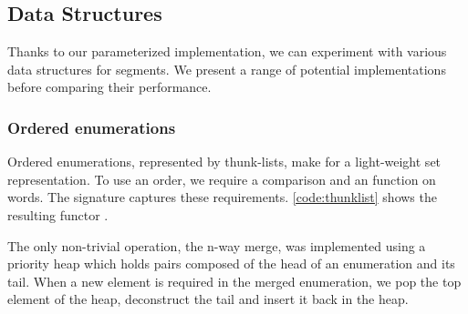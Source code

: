 

\subsection{Data Structures}

Thanks to our parameterized implementation, we can
experiment with various data structures for segments. We present a
range of potential implementations before comparing their performance.

\subsubsection{Ordered enumerations}

Ordered enumerations, represented by thunk-lists, make
for a light-weight set representation.
To use an order, we require a comparison and an
 function on words.  The  signature
captures these requirements. \autoref{code:thunklist} shows the
resulting functor .



The only non-trivial operation, the n-way merge, 
was implemented using a priority heap which holds pairs composed
of the head of an enumeration and its tail. When a new element is required in the
merged enumeration, we pop the top element of the heap, deconstruct
the tail and insert it back in the heap.

